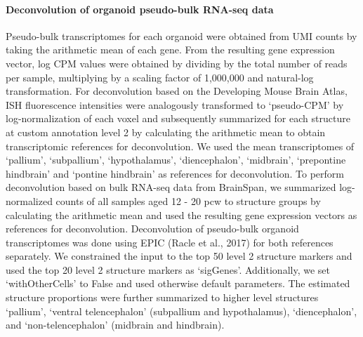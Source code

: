 \paragraph{Deconvolution of organoid pseudo-bulk RNA-seq data}
Pseudo-bulk transcriptomes for each organoid were obtained from UMI counts by taking the arithmetic mean of each gene. From the resulting gene expression vector, log CPM values were obtained by dividing by the total number of reads per sample, multiplying by a scaling factor of 1,000,000 and natural-log transformation. For deconvolution based on the Developing Mouse Brain Atlas, ISH fluorescence intensities were analogously transformed to ‘pseudo-CPM’ by log-normalization of each voxel and subsequently summarized for each structure at custom annotation level 2 by calculating the arithmetic mean to obtain transcriptomic references for deconvolution. We used the mean transcriptomes of ‘pallium’, ‘subpallium’, ‘hypothalamus’, ‘diencephalon’, ‘midbrain’, ‘prepontine hindbrain’ and ‘pontine hindbrain’ as references for deconvolution. To perform deconvolution based on bulk RNA-seq data from BrainSpan, we summarized log-normalized counts of all samples aged 12 - 20 pcw to structure groups by calculating the arithmetic mean and used the resulting gene expression vectors as references for deconvolution. Deconvolution of pseudo-bulk organoid transcriptomes was done using EPIC (Racle et al., 2017) for both references separately. We constrained the input to the top 50 level 2 structure markers and used the top 20 level 2 structure markers as ‘sigGenes’. Additionally, we set ‘withOtherCells’ to False and used otherwise default parameters. The estimated structure proportions were further summarized to higher level structures ‘pallium’, ‘ventral telencephalon’ (subpallium and hypothalamus), ‘diencephalon’, and ‘non-telencephalon’ (midbrain and hindbrain).

\beginbibliography